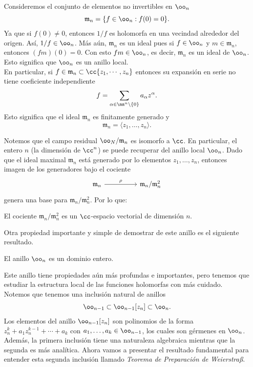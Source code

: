 	\begin{remark}
		Consideremos el conjunto de elementos no invertibles en $\oo_{n}$
		\begin{equation*}
			\mathfrak{m}_n=\{f\in\oo_{n}:f(0)=0\}.
		\end{equation*}
		Ya que si $f(0)\neq 0$, entonces $1/f$ es holomorfa en una vecindad alrededor del origen. Así, $1/f\in\oo_{n}$. Más aún, $\mathfrak{m}_n$ es un ideal pues si $f\in\oo_{n}$ y $m\in\mathfrak{m}_n$, entonces $(fm)(0)=0$. Con esto $fm\in\oo_{n}$, es decir, $\mathfrak{m}_n$ es un ideal de $\oo_{n}$. Esto significa que $\oo_{n}$ es un anillo local.\\
		En particular, si $f\in\mathfrak{m}_n\subset \cc\{z_1,\cdots,z_n\}$ entonces su expansión en serie no tiene coeficiente independiente
		\begin{equation*}
			f=\sum_{\alpha\in\nn^n\setminus\{0\}}a_\alpha z^{\alpha}.
		\end{equation*}
		Esto significa que el ideal $\mathfrak{m}_n$ es finitamente generado y
		\begin{equation*}
			\mathfrak{m}_n=\langle z_1,\dots,z_n \rangle.
		\end{equation*}
	\end{remark}
	Notemos que el campo residual $\oo_{N}/\mathfrak{m}_n$ es isomorfo a $\cc$. En particular, el entero $n$ (la dimensión de $\cc^n$) se puede recuperar del anillo local $\oo_{n}$. Dado que el ideal maximal $\mathfrak{m}_n$ está generado por lo elementos $z_1,\dots,z_n$, entonces imagen de los generadores bajo el cociente
	\[\begin{tikzcd}
		{\mathfrak{m}_n} && {\mathfrak{m}_n/\mathfrak{m}_n^2}
		\arrow["\rho", from=1-1, to=1-3]
	\end{tikzcd}\]
	genera una base para $\mathfrak{m}_n/\mathfrak{m}_n^2$. Por lo que:
	\begin{corollary}
		El cociente $\mathfrak{m}_n/\mathfrak{m}_n^2$ es un $\cc$-espacio vectorial de dimensión $n$.
	\end{corollary}
	
	Otra propiedad importante y simple de demostrar de este anillo es el siguiente resultado.
	
	\begin{propo}
		El anillo $\oo_{n}$ es un dominio entero.
	\end{propo}
	
	Este anillo tiene propiedades aún más profundas e importantes, pero tenemos que estudiar la estructura local de las funciones holomorfas con más cuidado. Notemos que tenemos una inclusión natural de anillos 
	\begin{equation*}
		\oo_{n-1}\subset \oo_{n-1}[z_n]\subset \oo_n.
	\end{equation*}
	Los elementos del anillo $\oo_{n-1}[z_n]$ son polinomios de la forma $z_n^k+a_1z_n^{k-1}+\cdots+a_k$ con $a_1,\dots,a_k\in \oo_{n-1}$, los cuales son gérmenes en $\oo_n$. Además, la primera inclusión tiene una naturaleza algebraica mientras que la segunda es más analítica. Ahora vamos a presentar el resultado fundamental para entender esta segunda inclusión llamado \textit{Teorema de Preparación de Weierstraß}.
	
